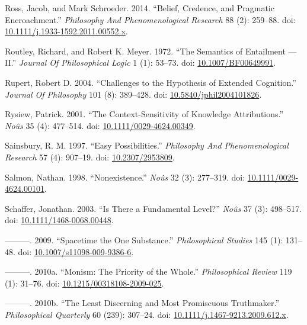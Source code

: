 \documentclass[
  10pt,
  letterpaper,
  DIV=11,
  numbers=noendperiod,
  twoside]{scrartcl}
\newlength{\cslhangindent}
\newenvironment{CSLReferences}[2] %
 {\begin{list}{}{%
  \setlength{\itemindent}{0pt}
  \setlength{\leftmargin}{0pt}
  \setlength{\parsep}{0pt}
  \ifodd #1
   \setlength{\leftmargin}{\cslhangindent}
   \setlength{\itemindent}{-1\cslhangindent}
  \fi
  \setlength{\itemsep}{#2\baselineskip}}}
 {\end{list}}
\begin{document}
\begin{CSLReferences}{1}{0}
Ross, Jacob, and Mark Schroeder. 2014. {``Belief, Credence, and
Pragmatic Encroachment.''} \emph{Philosophy And Phenomenological
Research} 88 (2): 259--88. doi:
\href{https://doi.org/10.1111/j.1933-1592.2011.00552.x}{10.1111/j.1933-1592.2011.00552.x}.

Routley, Richard, and Robert K. Meyer. 1972. {``The Semantics of
Entailment --- II.''} \emph{Journal Of Philosophical Logic} 1 (1):
53--73. doi:
\href{https://doi.org/10.1007/BF00649991}{10.1007/BF00649991}.

Rupert, Robert D. 2004. {``Challenges to the Hypothesis of Extended
Cognition.''} \emph{Journal Of Philosophy} 101 (8): 389--428. doi:
\href{https://doi.org/10.5840/jphil2004101826}{10.5840/jphil2004101826}.

Rysiew, Patrick. 2001. {``The Context-Sensitivity of Knowledge
Attributions.''} \emph{Noûs} 35 (4): 477--514. doi:
\href{https://doi.org/10.1111/0029-4624.00349}{10.1111/0029-4624.00349}.

Sainsbury, R. M. 1997. {``Easy Possibilities.''} \emph{Philosophy And
Phenomenological Research} 57 (4): 907--19. doi:
\href{https://doi.org/10.2307/2953809}{10.2307/2953809}.

Salmon, Nathan. 1998. {``Nonexistence.''} \emph{Noûs} 32 (3): 277--319.
doi:
\href{https://doi.org/10.1111/0029-4624.00101}{10.1111/0029-4624.00101}.

Schaffer, Jonathan. 2003. {``Is There a Fundamental Level?''}
\emph{Noûs} 37 (3): 498--517. doi:
\href{https://doi.org/10.1111/1468-0068.00448}{10.1111/1468-0068.00448}.

---------. 2009. {``Spacetime the One Substance.''} \emph{Philosophical
Studies} 145 (1): 131--48. doi:
\href{https://doi.org/10.1007/s11098-009-9386-6}{10.1007/s11098-009-9386-6}.

---------. 2010a. {``Monism: The Priority of the Whole.''}
\emph{Philosophical Review} 119 (1): 31--76. doi:
\href{https://doi.org/10.1215/00318108-2009-025}{10.1215/00318108-2009-025}.

---------. 2010b. {``The Least Discerning and Most Promiscuous
Truthmaker.''} \emph{Philosophical Quarterly} 60 (239): 307--24. doi:
\href{https://doi.org/10.1111/j.1467-9213.2009.612.x}{10.1111/j.1467-9213.2009.612.x}.


\end{CSLReferences}
\end{document}
